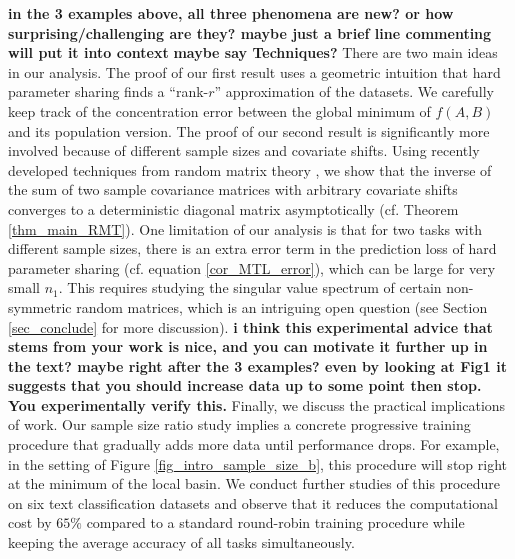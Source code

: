 \textbf{in the 3 examples above, all three phenomena are new? or how surprising/challenging are they? maybe just a brief line commenting will put it into context}
\textbf{maybe say Techniques?}
There are two main ideas in our analysis. The proof of our first result uses a geometric intuition that hard parameter sharing finds a ``rank-$r$'' approximation of the datasets.
We carefully keep track of the concentration error between the global minimum of $f(A, B)$ and its population version.
The proof of our second result is significantly more involved because of different sample sizes and covariate shifts. Using recently developed techniques from random matrix theory \cite{Anisotropic}, we show that the inverse of the sum of two sample covariance matrices with arbitrary covariate shifts converges to a deterministic diagonal matrix asymptotically (cf. Theorem \ref{thm_main_RMT}). %
One limitation of our analysis is that for two tasks with different sample sizes, there is an extra error term in the prediction loss of hard parameter sharing (cf. equation \eqref{cor_MTL_error}), which can be large for very small $n_1$. This requires studying the singular value spectrum of certain non-symmetric random matrices, which is an intriguing open question (see Section \ref{sec_conclude} for more discussion).
\textbf{i think this experimental advice that stems from your work is nice, and you can motivate it further up in the text? maybe right after the 3 examples? even by looking at Fig1 it suggests that you should increase data up to some point then stop. You experimentally verify this.} 
Finally, we discuss the practical implications of work.
Our sample size ratio study implies a concrete progressive training procedure that gradually adds more data until performance drops.
For example, in the setting of Figure \ref{fig_intro_sample_size_b}, this procedure will stop right at the minimum of the local basin.
We conduct further studies of this procedure on six text classification datasets and observe that it reduces the computational cost by $65\%$ compared to a standard round-robin training procedure while keeping the average accuracy of all tasks simultaneously.

